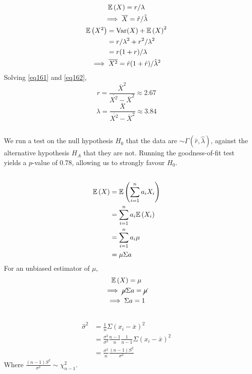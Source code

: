 \documentclass[twocolumn]{article}
\numberwithin{equation}{section}
\renewcommand{\bar}[1]{\overline{#1}}
\begin{document}
\subsection{}
\begin{gather}
\mathbb{E}\left(X\right)=r/\lambda\nonumber\\
\implies \overline X=\hat r/\hat \lambda\label{eq161}\\
\begin{aligned}
\mathbb{E}\left(X^2\right)&=\text{Var}(X)+\mathbb{E}\left(X\right)^2\\
&=r/\lambda^2+r^2/\lambda^2\\
&=r(1+r)/\lambda\\
\end{aligned}\nonumber\\
\implies \overline{X^2}=\hat r(1+\hat r)/{\hat{\lambda}}^2\label{eq162}
\end{gather}
Solving \ref{eq161} and \ref{eq162},
\[
r=\frac{\overline{X}^2}{\overline{X^2}-\overline{X}^2}\approx 2.67
\]\[
\lambda=\frac{\overline{X}}{\overline{X^2}-\overline{X}^2}\approx 3.84
\]

\subsection{}
We run a test on the null hypothesis $H_0$ that the data are $\sim\Gamma(\hat r,\hat\lambda)$, against the alternative hypothesis $H_A$ that they are not. Running the goodness-of-fit test yields a $p$-value of 0.78, allowing us to strongly favour $H_0$.

\subsection{}

\begin{align*}
\mathbb{E}\left(X\right)&=\mathbb{E}\left(\sum_{i=1}^n a_iX_i\right)\\
&=\sum_{i=1}^n a_i\mathbb{E}\left(X_i\right)\\
&=\sum_{i=1}^n a_i\mu\\
&=\mu\Sigma a
\end{align*}
For an unbiased estimator of $\mu$,\begin{gather*}
\mathbb{E}\left(X\right)=\mu\\
\implies \cancel{\mu}\Sigma a=\cancel{\mu}\\
\implies \Sigma a=1
\end{gather*}

\subsection{}
\begin{align*}
\hat\sigma^2&=\frac{1}{n}\Sigma(x_i-\bar x)^2\\
&=\frac{\sigma^2}{\sigma^2}\frac{n-1}{n}\frac{1}{n-1}\Sigma(x_i-\bar x)^2\\
&=\frac{\sigma^2}{n}\frac{(n-1)S^2}{\sigma^2}
\end{align*}
Where $\frac{(n-1)S^2}{\sigma^2}\sim\chi_{n-1}^2$.
\end{document}

